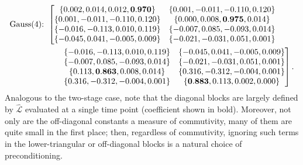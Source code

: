 \documentclass[review]{siamart}
\begin{document}
\begin{align*}
\textnormal{Gauss(4):}& \hspace{1ex}
\left[\begin{matrix}
\{0.002,0.014,0.012,\mathbf{0.970}\} & \{0.001,-0.011,-0.110,0.120\} \\
\{0.001,-0.011,-0.110,0.120\} & \{0.000,0.008,\mathbf{0.975},0.014\} \\
\{-0.016,-0.113,0.010,0.119\} & \{-0.007,0.085,-0.093,0.014\} \\
\{-0.045,0.041,-0.005,0.009\} & \{-0.021,-0.031,0.051,0.001\}
\end{matrix}\right.
\\&\hspace{5ex}
\left.\begin{matrix}
\{-0.016,-0.113,0.010,0.119\} & \{-0.045,0.041,-0.005,0.009\}\\
\{-0.007,0.085,-0.093,0.014\} & \{-0.021,-0.031,0.051,0.001\}\\
\{0.113,\mathbf{0.863},0.008,0.014\} & \{0.316,-0.312,-0.004,0.001\}\\
\{0.316,-0.312,-0.004,0.001\} & \{\mathbf{0.883},0.113,0.002,0.000\}\\
\end{matrix}\right].
\end{align*}
%
Analogous to the two-stage case, note that the diagonal blocks are largely
defined by $\widehat{\mathcal{L}}$ evaluated at a single time point (coefficient
shown in bold). Moreover, not only are the off-diagonal constants
a measure of commutivity, many of them are quite small in the first place;
then, regardless of commutivity, ignoring such terms in the lower-triangular
or off-diagonal blocks is a natural choice of preconditioning.
\end{document}
